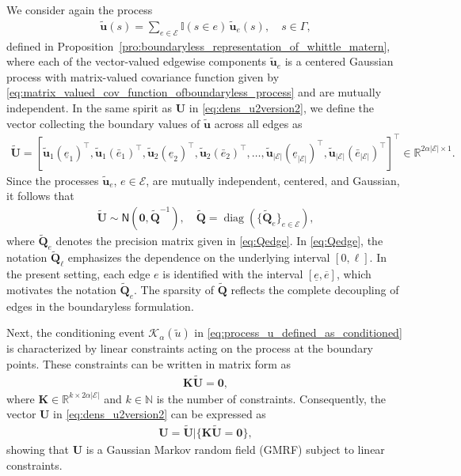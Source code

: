 \documentclass[11pt,a4paper]{article}
\theoremstyle{plain}
\theoremstyle{definition}
\begin{document}
We consider again the process
\begin{align*}
    \widetilde{\boldsymbol{u}}(s) 
    = \sum_{e\in\mathcal{E}} \mathbb{I}(s \in e)\,\widetilde{\boldsymbol{u}}_e(s), 
    \quad s \in \Gamma,
\end{align*}
defined in Proposition~\ref{pro:boundaryless_representation_of_whittle_matern}, where each of the vector-valued edgewise components $\widetilde{\boldsymbol{u}}_e$ is a centered Gaussian process with matrix-valued covariance function given by \eqref{eq:matrix_valued_cov_function_ofboundaryless_process} and are mutually independent. In the same spirit as $\mathbf{U}$ in \eqref{eq:dens_u2version2}, we define the vector collecting the boundary values of $\widetilde{\boldsymbol{u}}$ across all edges as
\begin{align*}
	\widetilde{\mathbf{U}} = [\widetilde{\boldsymbol{u}}_1(\underline{e}_1)^\top,\widetilde{\boldsymbol{u}}_1(\bar{e}_1)^\top,\widetilde{\boldsymbol{u}}_2(\underline{e}_2)^\top,\widetilde{\boldsymbol{u}}_2(\bar{e}_2)^\top,\ldots, \widetilde{\boldsymbol{u}}_{|\mathcal{E}|}(\underline{e}_{|\mathcal{E}|})^\top,\widetilde{\boldsymbol{u}}_{|\mathcal{E}|}(\bar{e}_{|\mathcal{E}|})^\top]^\top\in\mathbb{R}^{2\alpha|\mathcal{E}|\times1}.
\end{align*}
Since the processes $\widetilde{\boldsymbol{u}}_e$, $e \in \mathcal{E}$, are mutually independent, centered, and Gaussian, it follows that
\begin{align}
\label{eq:distribution_ofU_tilde}
    \widetilde{\mathbf{U}}\sim\mathsf{N}(\mathbf{0}, \widetilde{\mathbf{Q}}^{-1}), \quad \widetilde{\mathbf{Q}} = \operatorname{diag}(\{\widetilde{\mathbf{Q}}_e\}_{e\in\mathcal{E}}),
\end{align}
where $\widetilde{\mathbf{Q}}_e$ denotes the precision matrix given in \eqref{eq:Qedge}. In \eqref{eq:Qedge}, the notation $\widetilde{\mathbf{Q}}_\ell$ emphasizes the dependence on the underlying interval $[0,\ell]$. In the present setting, each edge $e$ is identified with the interval $[\underline{e}, \overline{e}]$, which motivates the notation $\widetilde{\mathbf{Q}}_e$. The sparsity of $\widetilde{\mathbf{Q}}$ reflects the complete decoupling of edges in the boundaryless formulation.

Next, the conditioning event $\mathcal{K}_\alpha(\widetilde{u})$ in \eqref{eq:process_u_defined_as_conditioned} is characterized by linear constraints acting on the process at the boundary points. These constraints can be written in matrix form as
\begin{align*}
\mathbf{K}\widetilde{\mathbf{U}} = \mathbf{0},
\end{align*}
where $\mathbf{K} \in \mathbb{R}^{k \times 2\alpha|\mathcal{E}|}$ and $k \in \mathbb{N}$ is the number of constraints. Consequently, the vector $\mathbf{U}$ in \eqref{eq:dens_u2version2} can be expressed as
\begin{align}
\label{eq:U_as_conditioned_onKU}
\mathbf{U} = \widetilde{\mathbf{U}} | \{\mathbf{K}\widetilde{\mathbf{U}} = \mathbf{0}\},
\end{align}
showing that $\mathbf{U}$ is a Gaussian Markov random field (GMRF) subject to linear constraints.
\end{document}
